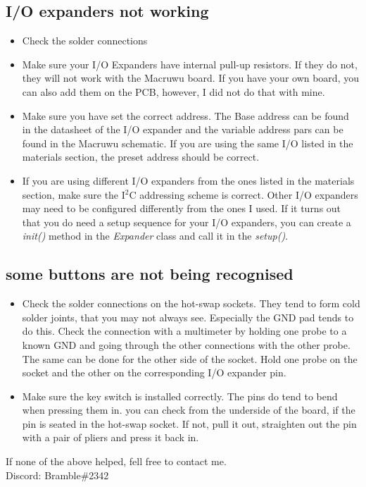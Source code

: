 \documentclass[english, 12pt]{scrartcl}
\begin{document}
	\subsection{I/O expanders not working}
	\begin{itemize}
		\item Check the solder connections
		\item Make sure your I/O Expanders have internal pull-up resistors. If they do not, they will not work with the Macruwu board. If you have your own board, you can also add them on the PCB, however, I did not do that with mine.
		\item Make sure you have set the correct address. The Base address can be found in the datasheet of the I/O expander and the variable address pars can be found in the Macruwu schematic. If you are using the same I/O listed in the materials section, the preset address should be correct.
		\item If you are using different I/O expanders from the ones listed in the materials section, make sure the I$^2$C addressing scheme is correct. Other I/O expanders may need to be configured differently from the ones I used. If it turns out that you do need a setup sequence for your I/O expanders, you can create a \textit{init()} method in the \textit{Expander} class and call it in the \textit{setup()}.
	\end{itemize}
	\subsection{some buttons are not being recognised}
	\begin{itemize}
		\item Check the solder connections on the hot-swap sockets. They tend to form cold solder joints, that you may not always see. Especially the GND pad tends to do this. Check the connection with a multimeter by holding one probe to a known GND and going through the other connections with the other probe. The same can be done for the other side of the socket. Hold one probe on the socket and the other on the corresponding I/O expander pin.
		\item Make sure the key switch is installed correctly. The pins do tend to bend when pressing them in. you can check from the underside of the board, if the pin is seated in the hot-swap socket. If not, pull it out, straighten out the pin with a pair of pliers and press it back in.
	\end{itemize}
	If none of the above helped, fell free to contact me.\\
	Discord: Bramble\#2342
\end{document}
